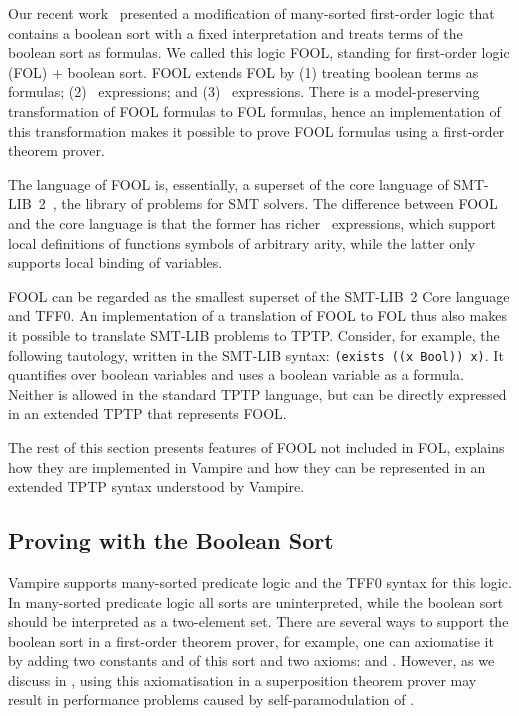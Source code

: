 Our recent work~\cite{FOOL} presented a modification of many-sorted first-order logic that contains a boolean sort with a fixed interpretation and treats terms of the boolean sort as formulas. We called this logic FOOL, standing for first-order logic (FOL) + boolean sort. FOOL extends FOL by (1) treating boolean terms as formulas; (2) \ITE\ expressions; and (3) \LETIN\ expressions. There is a model-preserving transformation of FOOL formulas to FOL formulas, hence an implementation of this transformation makes it possible to prove FOOL formulas using a first-order theorem prover.

The language of FOOL is, essentially, a superset of the core language of SMT-LIB~2~\cite{SMT-LIB}, the library of problems for SMT solvers. The difference between FOOL and the core language is that the former has richer \LETIN\ expressions, which support local definitions of functions symbols of arbitrary arity, while the latter only supports local binding of variables.

FOOL can be regarded as the smallest superset of the SMT-LIB~2 Core language and TFF0. An implementation of a translation of FOOL to FOL thus also makes it possible to translate SMT-LIB problems to TPTP. Consider, for example, the following tautology, written in the SMT-LIB syntax: \verb'(exists ((x Bool)) x)'. It quantifies over boolean variables and uses a boolean variable as a formula. Neither is allowed in the standard TPTP language, but can be directly expressed in an extended TPTP that represents FOOL.

The rest of this section presents features of FOOL not included in FOL, explains how they are implemented in Vampire and how they can be represented in an extended TPTP syntax understood by Vampire.

\subsection{Proving with the Boolean Sort}

Vampire supports many-sorted predicate logic and the TFF0 syntax for this logic. In many-sorted predicate logic all sorts are uninterpreted, while the boolean sort should be interpreted as a two-element set. There are several ways to support the boolean sort in a first-order theorem prover, for example, one can axiomatise it by adding two constants  and  of this sort and two axioms:  and . However, as we discuss in \cite{FOOL}, using this axiomatisation in a superposition theorem prover may result in performance problems caused by self-paramodulation of .

